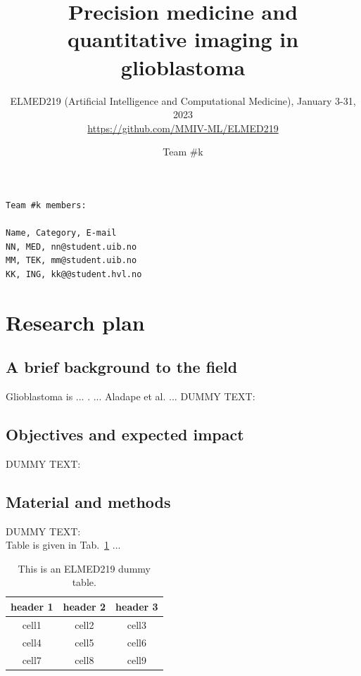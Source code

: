 \documentclass[11pt]{article}
\title{Precision medicine and quantitative imaging in glioblastoma}
\author{ELMED219 (Artificial Intelligence and Computational Medicine), January 3-31, 2023\\
{\footnotesize \url{https://github.com/MMIV-ML/ELMED219}}}
\date{Team \#k}
\begin{document}
\maketitle

\begin{scriptsize}
\begin{verbatim}
Team #k members:

Name, Category, E-mail	
NN, MED, nn@student.uib.no
MM, TEK, mm@student.uib.no
KK, ING, kk@@student.hvl.no

\end{verbatim}
\end{scriptsize}

\vspace{3mm}
\section{Research plan} %

\vspace{3mm}

\subsection{A brief background to the field}

Glioblastoma is ...  \cite{Louis2019}. ...  Aladape et al. \cite{Aldape2019} ... 
DUMMY TEXT:
\lipsum[5]

\subsection{Objectives and expected impact}

DUMMY TEXT:
\lipsum[5]


\subsection{Material and methods}

DUMMY TEXT:
\lipsum[6] \\

Table is given in Tab.~\ref{tab:elmed219-dummy} ...

\begin{table}[H]
\begin{center}
\begin{tabular}{ |c|c|c| } 
 \hline
 header 1 & header 2 & header 3 \\ 
 \hline
 cell1 & cell2 & cell3 \\ 
 cell4 & cell5 & cell6 \\ 
 cell7 & cell8 & cell9 \\ 
 \hline
\end{tabular}
\end{center}
\caption{This is an ELMED219 dummy table.}
\label{tab:elmed219-dummy}
\end{table}
\end{document}
